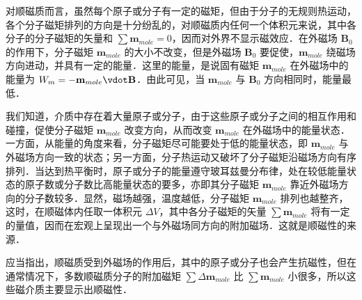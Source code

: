 
对顺磁质而言，虽然每个原子或分子有一定的磁矩，但由于分子的无规则热运动，各个分子磁矩排列的方向是十分纷乱的，对顺磁质内任何一个体积元来说，其中各分子的分子磁矩的矢量和 $\sum \mathbf{m}_{mole}=0$，因而对外界不显示磁效应．在外磁场 $\mathbf B_0$ 的作用下，分子磁矩 $\mathbf{m}_{mole}$ 的大小不改变，但是外磁场 $\mathbf B_0$ 要促使，$\mathbf{m}_{mole}$ 绕磁场方向进动，并具有一定的能量．这里的能量，是说固有磁矩 $\mathbf m_{mole}$ 在外磁场中的能量为 $W_m=-\mathbf m_{mole} \vdot \mathbf B$．由此可见，当 $\mathbf m_{mole}$ 与 $\mathbf B_0$ 方向相同时，能量最低．

我们知道，介质中存在着大量原子或分子，由于这些原子或分子之间的相互作用和碰撞，促使分子磁矩 $\mathbf m_{mole}$ 改变方向，从而改变 $\mathbf m_{mole}$ 在外磁场中的能量状态．一方面，从能量的角度来看，分子磁矩尽可能要处于低的能量状态，即 $\mathbf m_{mole}$ 与外磁场方向一致的状态；另一方面，分子热运动又破坏了分子磁矩沿磁场方向有序排列．当达到热平衡时，原子或分子的能量遵守玻耳兹曼分布律，处在较低能量状态的原子数或分子数比高能量状态的要多，亦即其分子磁矩 $\mathbf m_{mole}$ 靠近外磁场方向的分子数较多．显然，磁场越强，温度越低，分子磁矩 $\mathbf m_{mole}$ 排列也越整齐，这时，在顺磁体内任取一体积元 $\Delta V$，其中各分子磁矩的矢量 $\sum \mathbf m_{mole}$ 将有一定的量值，因而在宏观上呈现出一个与外磁场同方向的附加磁场．这就是顺磁性的来源．

应当指出，顺磁质受到外磁场的作用后，其中的原子或分子也会产生抗磁性，但在通常情况下，多数顺磁质分子的附加磁矩 $\sum \Delta\mathbf m_{mole}$ 比 $\sum \mathbf m_{mole}$ 小很多，所以这些磁介质主要显示出顺磁性．